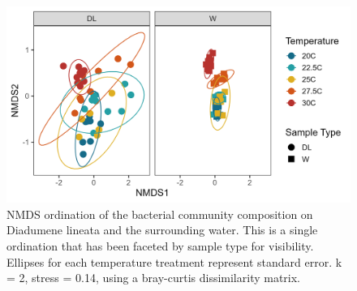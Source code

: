 \documentclass[
]{article}
\begin{document}
\begin{figure}

{\centering \includegraphics[width=0.8\linewidth]{../03_figs/LivingData2024_bray_NMDS} 

}

\caption{NMDS ordination of the bacterial community composition on Diadumene lineata and the surrounding water. This is a single ordination that has been faceted by sample type for visibility. Ellipses for each temperature treatment represent standard error. k = 2, stress = 0.14, using a bray-curtis dissimilarity matrix.}\label{fig:unnamed-chunk-1}
\end{figure}
\end{document}
